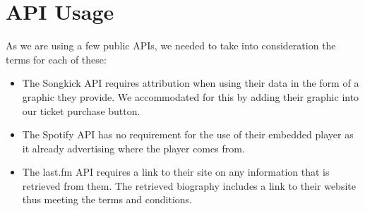 \documentclass[10pt]{article}
\begin{document}
    \section{API Usage}
        As we are using a few public APIs, we needed to take into consideration the terms for each of these:
        \begin{itemize}
            \item The Songkick API requires attribution when using their data in the form of a graphic they provide. We accommodated for this by adding their graphic into our ticket purchase button.

            \item The Spotify API has no requirement for the use of their embedded player as it already advertising where the player comes from.

            \item The last.fm API requires a link to their site on any information that is retrieved from them.  The retrieved biography includes a link to their website thus meeting the terms and conditions.
        \end{itemize}
\end{document}
